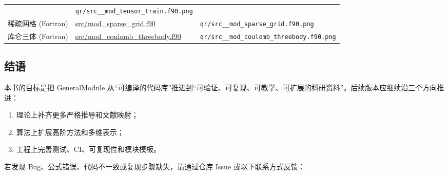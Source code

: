 \documentclass[
]{ctexbook}
\providecommand{\tightlist}{%
  \setlength{\itemsep}{0pt}\setlength{\parskip}{0pt}}
\let\origsubsection\subsection
\renewcommand{\subsection}[1]{%
  \needspace{6\baselineskip}%
  \origsubsection{#1}%
}
\begin{document}
\begin{longtable}[]{@{}lll@{}}
\begin{minipage}[t]{0.30\columnwidth}
\end{minipage} & \begin{minipage}[t]{0.30\columnwidth}\raggedright
\texttt{qr/src\_\_mod\_tensor\_train.f90.png}\strut
\end{minipage}\tabularnewline
\begin{minipage}[t]{0.30\columnwidth}\raggedright
稀疏网格 (Fortran)\strut
\end{minipage} & \begin{minipage}[t]{0.30\columnwidth}\raggedright
\href{https://github.com/l1Ha/QuantumGeneralModule/blob/main/src/mod_sparse_grid.f90}{src/mod\_sparse\_grid.f90}\strut
\end{minipage} & \begin{minipage}[t]{0.30\columnwidth}\raggedright
\texttt{qr/src\_\_mod\_sparse\_grid.f90.png}\strut
\end{minipage}\tabularnewline
\begin{minipage}[t]{0.30\columnwidth}\raggedright
库仑三体 (Fortran)\strut
\end{minipage} & \begin{minipage}[t]{0.30\columnwidth}\raggedright
\href{https://github.com/l1Ha/QuantumGeneralModule/blob/main/src/mod_coulomb_threebody.f90}{src/mod\_coulomb\_threebody.f90}\strut
\end{minipage} & \begin{minipage}[t]{0.30\columnwidth}\raggedright
\texttt{qr/src\_\_mod\_coulomb\_threebody.f90.png}\strut
\end{minipage}\tabularnewline
\bottomrule
\end{longtable}

\hypertarget{ux7ed3ux8bed}{%
\subsection{结语}\label{ux7ed3ux8bed}}

本书的目标是把 GeneralModule
从``可编译的代码库''推进到``可验证、可复现、可教学、可扩展的科研资料''。后续版本应继续沿三个方向推进：

\begin{enumerate}
\def\labelenumi{\arabic{enumi}.}
\tightlist
\item
  理论上补齐更多严格推导和文献映射；
\item
  算法上扩展高阶方法和多维表示；
\item
  工程上完善测试、CI、可复现性和模块模板。
\end{enumerate}

若发现 Bug、公式错误、代码不一致或复现步骤缺失，请通过仓库 Issue
或以下联系方式反馈：
\end{document}
